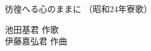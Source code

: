 \documentclass[10pt,b5j]{tarticle} %
\begin{document}
\begin{minipage}[c]{0.7\hsize} %
    \begin{center}
        {\LARGE
            彷徨へる心のままに %
        }
        {\small 
            （昭和24年寮歌） %
        }
    \end{center}
\end{minipage}
\begin{minipage}[c]{0.3\hsize} %
    \begin{flushright} %
        池田基君 作歌\\伊藤嘉弘君 作曲 %
    \end{flushright}
\end{minipage}
\end{document}
